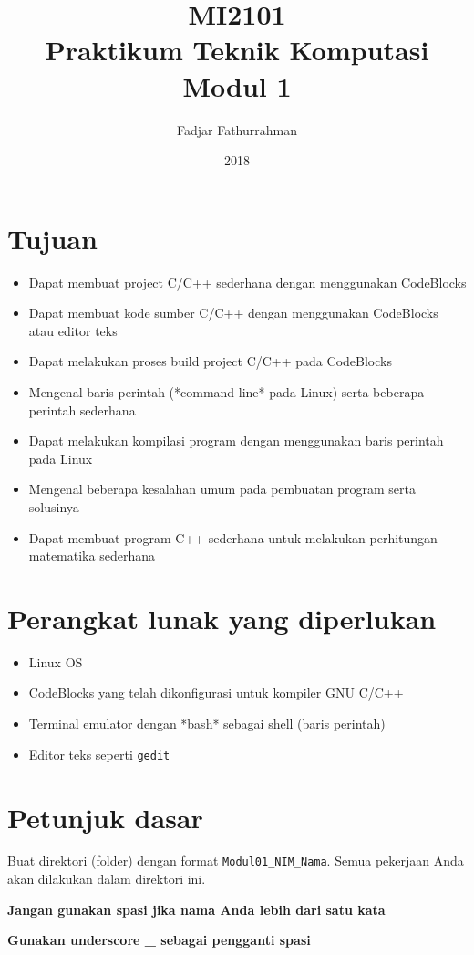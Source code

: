 \documentclass[a4paper,11pt]{extarticle}
\title{
MI2101\\
Praktikum Teknik Komputasi\\
Modul 1}
\author{Fadjar Fathurrahman}
\date{2018}
\begin{document}
\maketitle

\section{Tujuan}
\begin{itemize}
\item Dapat membuat project C/C++ sederhana dengan menggunakan CodeBlocks
\item Dapat membuat kode sumber C/C++ dengan menggunakan CodeBlocks
  atau editor teks
\item Dapat melakukan proses build project C/C++ pada CodeBlocks
\item Mengenal baris perintah (*command line* pada Linux) serta beberapa perintah sederhana
\item Dapat melakukan kompilasi program dengan menggunakan baris perintah pada Linux
\item Mengenal beberapa kesalahan umum pada pembuatan program serta solusinya
\item Dapat membuat program C++ sederhana untuk melakukan perhitungan matematika
sederhana
\end{itemize}

\section{Perangkat lunak yang diperlukan}
\begin{itemize}
\item Linux OS
\item CodeBlocks yang telah dikonfigurasi untuk kompiler GNU C/C++
\item Terminal emulator dengan *bash* sebagai shell (baris perintah)
\item Editor teks seperti \texttt{gedit}
\end{itemize}


\section{Petunjuk dasar}

Buat direktori (folder) dengan format \texttt{Modul01\_NIM\_Nama}. Semua
pekerjaan Anda akan dilakukan dalam direktori ini.

\textbf{Jangan gunakan spasi jika nama Anda lebih dari satu kata}

\textbf{Gunakan underscore \_ sebagai pengganti spasi}
\end{document}
